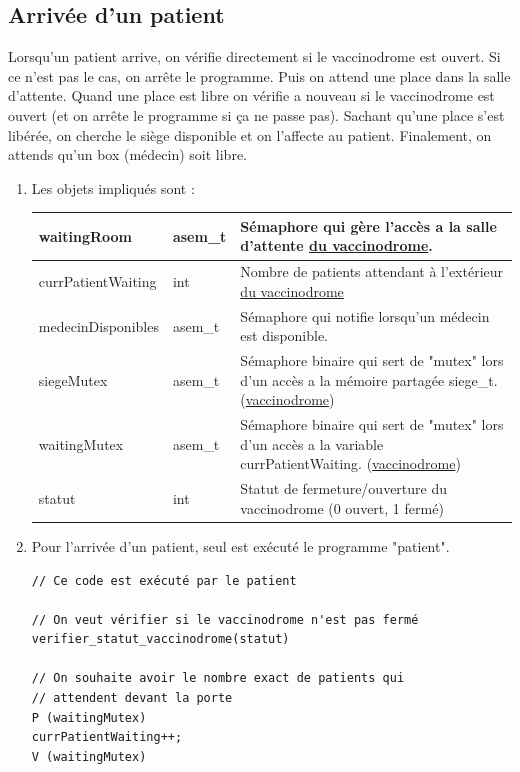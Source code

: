 \documentclass[a4paper]{article}
\begin{document}
  \subsection{Arrivée d'un patient}\label{arrivee-patient}

  Lorsqu'un patient arrive, on vérifie directement si le vaccinodrome est ouvert. Si ce n'est pas le cas, on arrête le programme. Puis on attend une place dans la salle d'attente. Quand une place est libre on vérifie a nouveau si le vaccinodrome est ouvert (et on arrête le programme si ça ne passe pas). Sachant qu'une place s'est libérée, on cherche le siège disponible et on l'affecte au patient.
  Finalement, on attends qu'un box (médecin) soit libre.

  \begin{enumerate}
    \item Les objets impliqués sont :

    \begin{tabularx}{\linewidth}{|l|l|>{\strut}X|}
      \hline%
      waitingRoom & asem\_t & Sémaphore qui gère l'accès a la salle d'attente \underline{du vaccinodrome}. \\ \hline%
      currPatientWaiting & int & Nombre de patients attendant à l'extérieur \underline{du vaccinodrome} \\ \hline%
      medecinDisponibles & asem\_t & Sémaphore qui notifie lorsqu'un médecin est disponible. \\ \hline%
      siegeMutex & asem\_t & Sémaphore binaire qui sert de "mutex" lors d'un accès a la mémoire partagée siege\_t. (\underline{vaccinodrome}) \\ \hline%
      waitingMutex & asem\_t & Sémaphore binaire qui sert de "mutex" lors d'un accès a la variable currPatientWaiting. (\underline{vaccinodrome}) \\ \hline%
      statut & int & Statut de fermeture/ouverture du vaccinodrome (0 ouvert, 1 fermé) \\ \hline%
    \end{tabularx}

    \item Pour l'arrivée d'un patient, seul est exécuté le programme "patient".

    \begin{verbatim}
// Ce code est exécuté par le patient

// On veut vérifier si le vaccinodrome n'est pas fermé
verifier_statut_vaccinodrome(statut)

// On souhaite avoir le nombre exact de patients qui
// attendent devant la porte
P (waitingMutex)
currPatientWaiting++;
V (waitingMutex)


\end{verbatim}
\end{enumerate}
\end{document}
